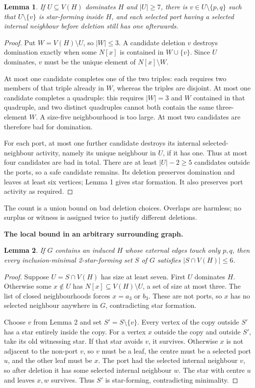 \documentclass[11pt]{article}
\newtheorem{lemma}{Lemma}
\begin{document}
\begin{lemma}
If $U\subseteq V(H)$ dominates $H$ and $|U|\ge7$, there is
$v\in U\setminus\{p,q\}$ such that $U\setminus\{v\}$ is star-forming
inside $H$, and each selected port having a selected internal neighbour
before deletion still has one afterwards.
\end{lemma}
\begin{proof}
Put $W=V(H)\setminus U$, so $|W|\le3$. A candidate deletion $v$ destroys
domination exactly when some $N[x]$ is contained in $W\cup\{v\}$.
Since $U$ dominates, $v$ must be the unique element of $N[x]\setminus W$.

At most one candidate completes one of the two triples: each requires two
members of that triple already in $W$, whereas the triples are disjoint.
At most one candidate completes a quadruple: this requires $|W|=3$ and
$W$ contained in that quadruple, and two distinct quadruples cannot both
contain the same three-element $W$. A size-five neighbourhood is too
large. At most two candidates are therefore bad for domination.

For each port, at most one further candidate destroys its internal
selected-neighbour activity, namely its unique neighbour in $U$, if it
has one. Thus at most four candidates are bad in total. There are at least
$|U|-2\ge5$ candidates outside the ports, so a safe candidate remains.
Its deletion preserves domination and leaves at least six vertices;
Lemma 1 gives star formation. It also preserves port activity as required.
\end{proof}

The count is a union bound on bad deletion choices. Overlaps are harmless;
no surplus or witness is assigned twice to justify different deletions.

\newpage
\textbf{The local bound in an arbitrary surrounding graph.}

\begin{lemma}
If $G$ contains an induced $H$ whose external edges touch only $p,q$, then
every inclusion-minimal 2-star-forming set $S$ of $G$ satisfies
$|S\cap V(H)|\le6$.
\end{lemma}
\begin{proof}
Suppose $U=S\cap V(H)$ has size at least seven. First $U$ dominates $H$.
Otherwise some $x\notin U$ has $N[x]\subseteq V(H)\setminus U$, a set of
size at most three. The list of closed neighbourhoods forces $x=a_3$
or $b_3$. These are not ports, so $x$ has no selected neighbour anywhere
in $G$, contradicting star formation.

Choose $v$ from Lemma 2 and set $S'=S\setminus\{v\}$. Every vertex of
the copy outside $S'$ has a star entirely inside the copy. For a vertex
$x$ outside the copy and outside $S'$, take its old witnessing star.
If that star avoids $v$, it survives. Otherwise $x$ is not adjacent to the
non-port $v$, so $v$ must be a leaf, the centre must be a selected port
$u$, and the other leaf must be $x$. The port had the selected internal
neighbour $v$, so after deletion it has some selected internal neighbour
$w$. The star with centre $u$ and leaves $x,w$ survives. Thus $S'$ is
star-forming, contradicting minimality.
\end{proof}
\end{document}
